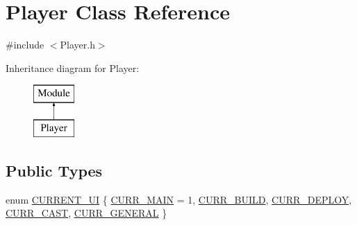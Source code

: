 \hypertarget{class_player}{}\section{Player Class Reference}
\label{class_player}


{\ttfamily \#include $<$Player.\+h$>$}

Inheritance diagram for Player\+:\begin{figure}[H]
\begin{center}
\leavevmode
\includegraphics[height=2.000000cm]{class_player}
\end{center}
\end{figure}
\subsection*{Public Types}
\begin{DoxyCompactItemize}
\item 
enum \mbox{\hyperlink{class_player_a5d4417b196345195ecceabcf9cd81bdf}{C\+U\+R\+R\+E\+N\+T\+\_\+\+UI}} \{ \newline
\mbox{\hyperlink{class_player_a5d4417b196345195ecceabcf9cd81bdfabef03a3a55d2b8392614dc29ec87f7d1}{C\+U\+R\+R\+\_\+\+M\+A\+IN}} = 1, 
\mbox{\hyperlink{class_player_a5d4417b196345195ecceabcf9cd81bdfa5acbad97c3a07a708d25400a0304484f}{C\+U\+R\+R\+\_\+\+B\+U\+I\+LD}}, 
\mbox{\hyperlink{class_player_a5d4417b196345195ecceabcf9cd81bdfaeae28732879cfa90230734c6c19d3aca}{C\+U\+R\+R\+\_\+\+D\+E\+P\+L\+OY}}, 
\mbox{\hyperlink{class_player_a5d4417b196345195ecceabcf9cd81bdfaf5541a8af149bbb37d48cecfa3d3ff36}{C\+U\+R\+R\+\_\+\+C\+A\+ST}}, 
\newline
\mbox{\hyperlink{class_player_a5d4417b196345195ecceabcf9cd81bdfa698713392921ab17bde944b099ecc949}{C\+U\+R\+R\+\_\+\+G\+E\+N\+E\+R\+AL}}
 \}
\end{DoxyCompactItemize}
